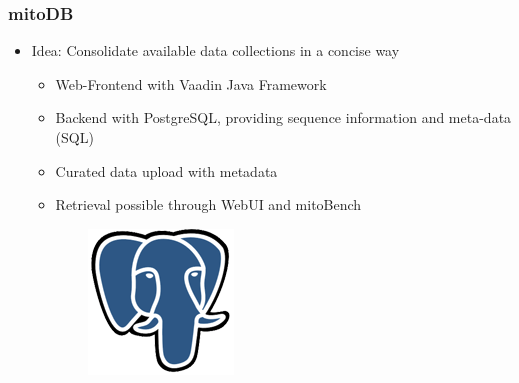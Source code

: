 \documentclass{beamer} %
\begin{document}
%
%

\begin{frame}
\frametitle{mitoDB}
\begin{itemize}
\item Idea: Consolidate available data collections in a concise way
	\begin{itemize}
		\item Web-Frontend with Vaadin Java Framework
		\item Backend with PostgreSQL, providing sequence information and meta-data (SQL)
        \item Curated data upload with metadata
        \item Retrieval possible through WebUI and mitoBench
	\end{itemize}
\end{itemize}
\begin{figure}
\centering
    \begin{subfigure}[b]{0.3\textwidth}
        \includegraphics[width=\textwidth]{imagesBench/postgresql.png}

\end{subfigure}
\end{figure}
\end{frame}
\end{document}
